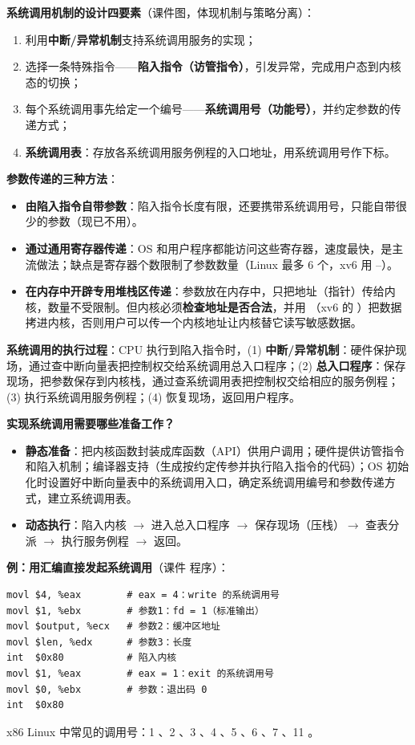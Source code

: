 \textbf{系统调用机制的设计四要素}（课件图，体现机制与策略分离）：
\begin{enumerate}
    \item 利用\textbf{中断/异常机制}支持系统调用服务的实现；
    \item 选择一条特殊指令——\textbf{陷入指令（访管指令）}，引发异常，完成用户态到内核态的切换；
    \item 每个系统调用事先给定一个编号——\textbf{系统调用号（功能号）}，并约定参数的传递方式；
    \item \textbf{系统调用表}：存放各系统调用服务例程的入口地址，用系统调用号作下标。
\end{enumerate}

\textbf{参数传递的三种方法}：
\begin{itemize}
    \item \textbf{由陷入指令自带参数}：陷入指令长度有限，还要携带系统调用号，只能自带很少的参数（现已不用）。
    \item \textbf{通过通用寄存器传递}：OS 和用户程序都能访问这些寄存器，速度最快，是主流做法；缺点是寄存器个数限制了参数数量（Linux 最多 6 个，xv6 用 –）。
    \item \textbf{在内存中开辟专用堆栈区传递}：参数放在内存中，只把地址（指针）传给内核，数量不受限制。但内核必须\textbf{检查地址是否合法}，并用 （xv6 的 ）把数据拷进内核，否则用户可以传一个内核地址让内核替它读写敏感数据。
\end{itemize}

\textbf{系统调用的执行过程}：CPU 执行到陷入指令时，(1) \textbf{中断/异常机制}：硬件保护现场，通过查中断向量表把控制权交给系统调用总入口程序；(2) \textbf{总入口程序}：保存现场，把参数保存到内核栈，通过查系统调用表把控制权交给相应的服务例程；(3) 执行系统调用服务例程；(4) 恢复现场，返回用户程序。

\textbf{实现系统调用需要哪些准备工作？}
\begin{itemize}
    \item \textbf{静态准备}：把内核函数封装成库函数（API）供用户调用；硬件提供访管指令和陷入机制；编译器支持（生成按约定传参并执行陷入指令的代码）；OS 初始化时设置好中断向量表中的系统调用入口，确定系统调用编号和参数传递方式，建立系统调用表。
    \item \textbf{动态执行}：陷入内核 $\to$ 进入总入口程序 $\to$ 保存现场（压栈）$\to$ 查表分派 $\to$ 执行服务例程 $\to$ 返回。
\end{itemize}

\textbf{例：用汇编直接发起系统调用}（课件  程序）：\par
\begin{lstlisting}
movl $4, %eax        # eax = 4：write 的系统调用号
movl $1, %ebx        # 参数1：fd = 1（标准输出）
movl $output, %ecx   # 参数2：缓冲区地址
movl $len, %edx      # 参数3：长度
int  $0x80           # 陷入内核
movl $1, %eax        # eax = 1：exit 的系统调用号
movl $0, %ebx        # 参数：退出码 0
int  $0x80
\end{lstlisting}
x86 Linux 中常见的调用号：1 、2 、3 、4 、5 、6 、7 、11 。

